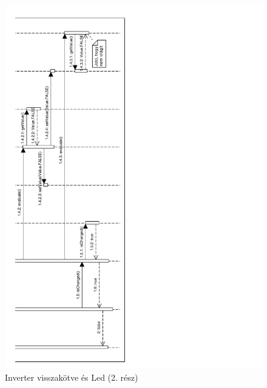 \begin{figure}[H]
\includegraphics[width=16.5cm]{chapters/chapter05/imgs/test4-2.pdf}
\caption{Inverter visszakötve és Led (2. rész)}
\label{fig:init}
\end{figure}


